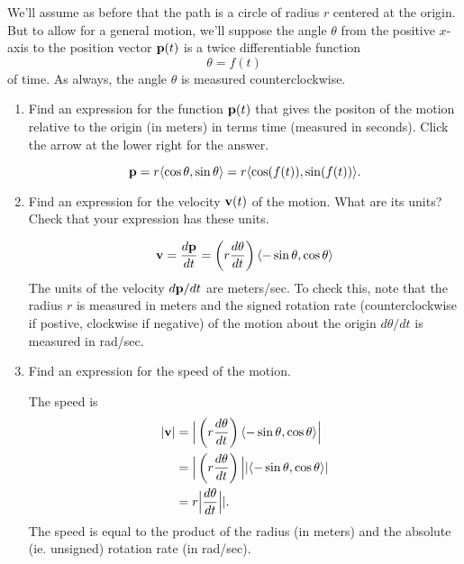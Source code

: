 \documentclass{ximera}
\begin{document}
\begin{question} \label{Q324234fgfg}
We'll assume as before that the path is a circle of radius $r$ centered at the origin. But to allow for a general motion, we'll suppose the angle $\theta$ from the positive $x$-axis to the position vector ${\bf p}(t)$ is a twice differentiable function
\[
   \theta = f(t)
\]
of time. As always, the angle $\theta$ is measured counterclockwise. 

\begin{enumerate}
\item Find an expression for the function ${\bf p}(t)$ that gives the positon of the motion relative to the origin (in meters) in terms time (measured in seconds). Click the arrow at the lower right for the answer.

\begin{expandable}
\[
   {\bf p} = r \langle \cos \theta , \sin\theta \rangle = r \langle \cos (f(t)) , \sin (f(t)) \rangle .
\]
\end{expandable}

\item Find an expression for the velocity ${\bf v}(t)$ of the motion. What are its units? Check that your expression has these units.
\begin{expandable}
\begin{align*}
   {\bf v} &= \frac{d{\bf p}}{dt}  = \left( r \frac{d\theta}{dt} \right) \langle -\sin \theta , \cos\theta \rangle  \\
\end{align*}
The units of the velocity $d{\bf p}/dt$ are meters/sec. To check this, note that the radius $r$ is measured in meters and the signed rotation rate (counterclockwise if postive, clockwise if negative) of the motion about the origin $d\theta/dt$ is measured in rad/sec.
\end{expandable}

\item Find an expression for the speed of the motion.

\begin{expandable}
The speed is
\begin{align*}
  | {\bf v} |  & = \Big|  \left( r \frac{d\theta}{dt} \right) \langle -\sin \theta , \cos\theta \rangle \Big|   \\
                & =  \Big| \left( r \frac{d\theta}{dt} \right) \Big| |  \langle -\sin \theta , \cos\theta \rangle  | \\
                &= r \Big|\frac{d\theta}{dt} \Big| | .
\end{align*}
The speed is equal to the product of the radius (in meters) and the absolute (ie. unsigned) rotation rate (in rad/sec).
\end{expandable}


\end{enumerate}
\end{question}
\end{document}
